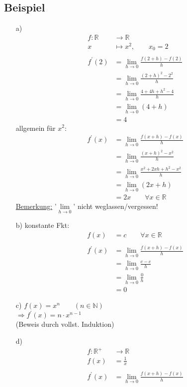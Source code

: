 \documentclass[12pt, titlepage]{article}
\newcommand{\R}{\mathds{R}}
\newcommand{\N}{\mathds{N}}
\renewcommand{\>}{\rightarrow}
\renewcommand{\*}{\cdot}
\begin{document}
	\subsection{Beispiel}
	\begin{itemize}
		\item[a)] \begin{align*}
			f\colon\R&\>\R\\
			x&\mapsto x^2,\qquad x_0=2\\
			&\\
			f^\prime(2)&=\lim\limits_{h\>0}\frac{f(2+h)-f(2)}{h}\\
			&=\lim\limits_{h\>0}\frac{(2+h)^2-2^2}{h}\\
			&=\lim\limits_{h\>0}\frac{4+4h+h^2-4}{h}\\
			&=\lim\limits_{h\>0}(4+h)\\
			&=4
		\end{align*}
		allgemein für $x^2$:
		\begin{align*}
			f^\prime(x)&=\lim\limits_{h\>0}\frac{f(x+h)-f(x)}{h}\\
			&=\lim\limits_{h\>0}\frac{(x+h)^2-x^2}{h}\\
			&=\lim\limits_{h\>0}\frac{x^2+2xh+h^2-x^2}{h}\\
			&=\lim\limits_{h\>0}(2x+h)\\
			&=2x\qquad\forall x\in\R
		\end{align*}
		\underline{Bemerkung:} '$\lim\limits_{h\>0}$' nicht weglassen/vergessen!
		\item[b)] konstante Fkt:\begin{align*}
			f(x)&=c\qquad\forall x\in\R\\
			&\\
			f^\prime(x)&=\lim\limits_{h\>0}\frac{f(x+h)-f(x)}{h}\\
			&=\lim\limits_{h\>0}\frac{c-c}{h}\\
			&=\lim\limits_{h\>0}\frac{0}{h}\\
			&=0
		\end{align*}
		\item[c)] $f(x)=x^n\qquad (n\in\N)$\\
		$\Rightarrow f^\prime(x)=n\*x^{n-1}$\\
		(Beweis durch vollst. Induktion)
		\item[d)] \begin{align*}
			f\colon\R^+&\>\R\\
			f(x)&=\frac{1}{x}\\
			&\\
			f^\prime(x)&=\lim\limits_{h\>0}\frac{f(x+h)-f(x)}{h}\\

\end{align*}
\end{itemize}
\end{document}
